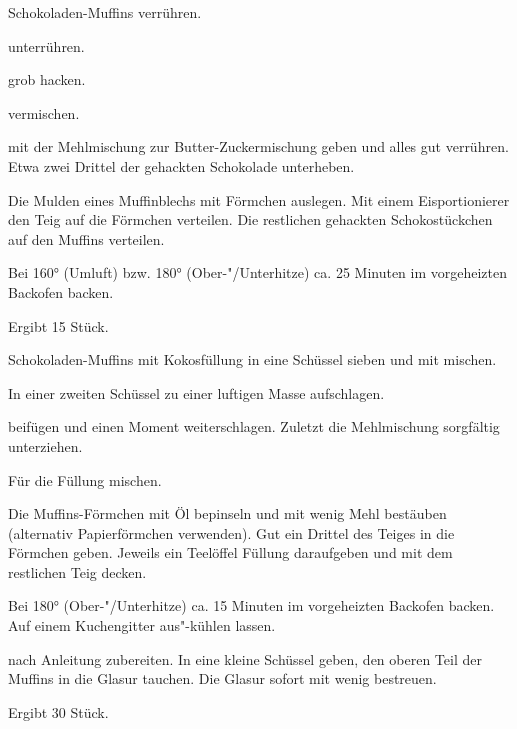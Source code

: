 \begin{recipe}{Schokoladen-Muffins}
  verrühren.

  unterrühren.

  grob hacken.

  vermischen.

  mit der Mehlmischung zur Butter-Zuckermischung geben und alles gut
  verrühren. Etwa zwei Drittel der gehackten Schokolade unterheben.

  Die Mulden eines Muffinblechs mit Förmchen auslegen. Mit einem
  Eisportionierer den Teig auf die Förmchen verteilen. Die restlichen
  gehackten Schokostückchen auf den Muffins verteilen.

  Bei 160° (Umluft) bzw. 180° (Ober-"/Unterhitze) ca. 25 Minuten im
  vorgeheizten Backofen backen.

  Ergibt 15 Stück.
\end{recipe}

\begin{recipe}{Schokoladen-Muffins mit Kokosfüllung}
  in eine Schüssel sieben und mit
  mischen.

  In einer zweiten Schüssel
  zu einer luftigen Masse aufschlagen.

  beifügen und einen Moment weiterschlagen. Zuletzt die Mehlmischung
  sorgfältig unterziehen.

  Für die Füllung
  mischen.

  Die Muffins-Förmchen mit Öl bepinseln und mit wenig Mehl bestäuben
  (alternativ Papierförmchen verwenden). Gut ein Drittel des Teiges in
  die Förmchen geben. Jeweils ein Teelöffel Füllung daraufgeben und mit
  dem restlichen Teig decken.

  Bei 180° (Ober-"/Unterhitze) ca. 15 Minuten im vorgeheizten Backofen
  backen. Auf einem Kuchengitter aus"-kühlen lassen.

  nach Anleitung zubereiten. In eine kleine Schüssel geben, den oberen
  Teil der Muffins in die Glasur tauchen. Die Glasur sofort mit wenig
  bestreuen.

  Ergibt 30 Stück.
\end{recipe}

